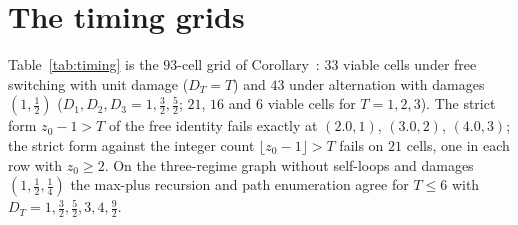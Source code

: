 \section{The timing grids}\label{si:timing}

Table~\ref{tab:timing} is the $93$-cell grid of Corollary~: $33$ viable cells under free switching with unit damage ($D_T=T$) and $43$ under alternation with damages $(1,\tfrac12)$ ($D_1,D_2,D_3=1,\tfrac32,\tfrac52$; $21$, $16$ and $6$ viable cells for $T=1,2,3$). The strict form $z_0-1>T$ of the free identity fails exactly at $(2.0,1)$, $(3.0,2)$, $(4.0,3)$; the strict form against the integer count $\lfloor z_0-1\rfloor>T$ fails on $21$ cells, one in each row with $z_0\ge 2$. On the three-regime graph without self-loops and damages $(1,\tfrac12,\tfrac14)$ the max-plus recursion and path enumeration agree for $T\le 6$ with $D_T=1,\tfrac32,\tfrac52,3,4,\tfrac92$.


